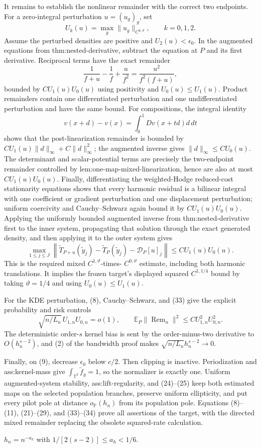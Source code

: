 It remains to establish the nonlinear remainder with the correct two endpoints.  For a zero-integral perturbation \(u=(u_g)_g\), set
\[
 U_k(u)=\max_g\|u_g\|_{C^{k,\vartheta}},\qquad k=0,1,2.
\tag{30}
\]
Assume the perturbed densities are positive and \(U_2(u)<\epsilon_0\).  In the augmented equations from thm:nested-derivative, subtract the equation at \(P\) and its first derivative.  Reciprocal terms have the exact remainder
\[
 \frac1{f+u}-\frac1f+\frac{u}{f^2}
 =\frac{u^2}{f^2(f+u)},
\tag{31}
\]
bounded by \(C U_1(u)U_0(u)\) using positivity and
\(U_0(u)\leq U_1(u)\).  Product remainders contain one differentiated perturbation and one undifferentiated perturbation and have the same bound.  For compositions, the integral identity
\[
 v(x+d)-v(x)=\int_0^1Dv(x+td)d\,dt
\tag{32}
\]
shows that the post-linearization remainder is bounded by
\(C U_1(u)\|d\|_\infty+C\|d\|_\infty^2\); the augmented inverse gives
\(\|d\|_\infty\leq C U_0(u)\).  The determinant and scalar-potential terms are precisely the two-endpoint remainder controlled by lem:one-map-mixed-linearization, hence are also at most \(C U_1(u)U_0(u)\).  Finally, differentiating the weighted-Hodge reduced-cost stationarity equations shows that every harmonic residual is a bilinear integral with one coefficient or gradient perturbation and one displacement perturbation; uniform coercivity and Cauchy--Schwarz again bound it by \(C U_1(u)U_0(u)\).  Applying the uniformly bounded augmented inverse from thm:nested-derivative first to the inner system, propagating that solution through the exact generated density, and then applying it to the outer system gives
\[
 \max_{1\leq j\leq J}
 \left\|
 \widetilde T_{P+u}(\widetilde y_j)-\widetilde T_P(\widetilde y_j)
 -\mathcal D_P[u]_j
 \right\|
 \leq C U_1(u)U_0(u).
\tag{33}
\]
This is the required mixed \(C^{1,\vartheta}\)-times-
\(C^{0,\vartheta}\) estimate, including both harmonic translations.  It implies the frozen target's displayed squared \(C^{1,1/4}\) bound by taking \(\vartheta=1/4\) and using
\(U_0(u)\leq U_1(u)\).

For the KDE perturbation, (8), Cauchy--Schwarz, and (33) give the explicit probability and risk controls
\[
 \sqrt{n/L_n}\,U_{1,n}U_{0,n}=o(1),
 \qquad
 \mathbb E_P\|\operatorname{Rem}_n\|^2
 \leq C U_{1,n}^2U_{0,n}^2.
\tag{34}
\]
The deterministic order-\(s\) kernel bias is sent by the order-minus-two derivative to
\(O(h_n^{s-2})\), and (2) of the bandwidth proof makes
\(\sqrt{n/L_n}h_n^{s-2}\to0\).

Finally, on (9), decrease \(\epsilon_0\) below \(c/2\).  Then clipping is inactive.  Periodization and ass:kernel-mass give
\(\int_{\mathbb T^2}\widetilde f_g=1\), so the normalizer is exactly one.  Uniform augmented-system stability, ass:lift-regularity, and (24)--(25) keep both estimated maps on the selected population branches, preserve uniform ellipticity, and put every pilot pole at distance
\(o_{\mathbb P}(h_n)\) from its population pole.  Equations (8)--(11), (21)--(29), and (33)--(34) prove all assertions of the target, with the directed mixed remainder replacing the obsolete squared-rate calculation.

\(h_n=n^{-a_h}\) with \(1/[2(s-2)]\leq a_h<1/6\).
